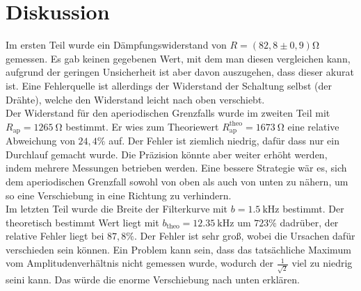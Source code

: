 \section{Diskussion}
\label{sec:Diskussion}
Im ersten Teil wurde ein Dämpfungswiderstand von $R = (82,8 \pm 0,9)\si{\ohm}$ gemessen.
Es gab keinen gegebenen Wert, mit dem man diesen vergleichen kann, aufgrund der geringen
Unsicherheit ist aber davon auszugehen, dass dieser akurat ist. Eine Fehlerquelle ist
allerdings der Widerstand der Schaltung selbst (der Drähte), welche den Widerstand leicht
nach oben verschiebt.
\\
Der Widerstand für den aperiodischen Grenzfalls wurde im zweiten Teil mit $R_\text{ap} =
\SI{1265}{\ohm}$ bestimmt. Er wies zum Theoriewert $R_\text{ap}^\text{theo} =
\SI{1673}{\ohm}$ eine relative Abweichung von $24,4\%$ auf. Der Fehler ist ziemlich niedrig,
dafür dass nur ein Durchlauf gemacht wurde. Die Präzision könnte aber weiter erhöht
werden, indem mehrere Messungen betrieben werden. Eine bessere Strategie wär es, sich dem
aperiodischen Grenzfall sowohl von oben als auch von unten zu nähern, um so eine
Verschiebung in eine Richtung zu verhindern.
\\
Im letzten Teil wurde die Breite der Filterkurve mit $b = \SI{1.5}{\kilo\hertz}$ bestimmt.
Der theoretisch bestimmt Wert liegt mit $b_\text{theo} = \SI{12.35}{\kilo\hertz}$ um
$723\%$ dadrüber, der relative Fehler liegt bei $87,8\%$. Der Fehler ist sehr groß, wobei
die Ursachen dafür verschieden sein können. Ein Problem kann sein, dass das
tatsächliche Maximum vom Amplitudenverhältnis nicht gemessen wurde, wodurch der
$\frac{1}{\sqrt{2}}$ viel zu niedrig seini kann. Das würde die enorme Verschiebung nach
unten erklären.


